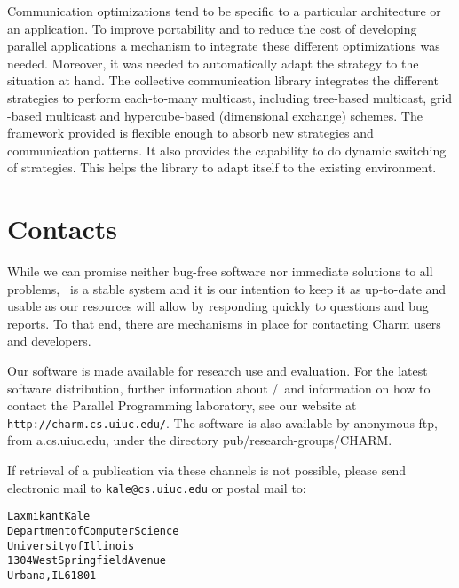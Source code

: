 Communication optimizations tend to be specific to a particular architecture or
an application. To improve portability and to reduce the cost of developing
parallel applications a mechanism to integrate these different optimizations
was needed. Moreover, it was needed to automatically adapt the strategy to the
situation at hand. The collective communication library integrates the
different strategies to perform each-to-many multicast, including tree-based
multicast, grid -based multicast and hypercube-based (dimensional exchange)
schemes. The framework provided is flexible enough to absorb new strategies and
communication patterns. It also provides the capability to do dynamic switching
of strategies. This helps the library to adapt itself to the existing
environment.

\section{Contacts}
\label{Distribution}

While we can promise neither bug-free software nor immediate solutions   
to all problems, \charmpp\ is a stable system and it is our intention to
keep it as up-to-date and usable as our resources will allow
by responding quickly to questions and bug reports.  To that
end, there are mechanisms in place for contacting Charm users
and developers. 

Our software is made available for research use and evaluation.
For the latest software distribution, further information about
\converse{}/\charmpp\ and information on how to contact the Parallel
Programming laboratory, see our website at \texttt{http://charm.cs.uiuc.edu/}.
The software is also available by
anonymous ftp, from a.cs.uiuc.edu, under the directory
pub/research-groups/CHARM.  

If retrieval of a publication via these channels is not possible,
please send electronic mail to \texttt{kale@cs.uiuc.edu} or postal mail to:

\begin{alltt}
   Laxmikant Kale
   Department of Computer Science 
   University of Illinois 
   1304 West Springfield Avenue 
   Urbana, IL 61801 
\end{alltt}
